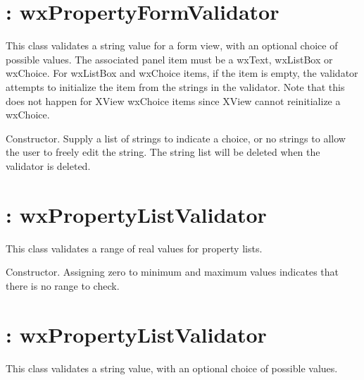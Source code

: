 \section{: wxPropertyFormValidator}\label{wxstringformvalidator}


This class validates a string value for a form view, with an optional choice of possible values.
The associated panel item must be a wxText, wxListBox or wxChoice. For wxListBox and wxChoice items,
if the item is empty, the validator attempts to initialize the item from the strings in
the validator. Note that this does not happen for XView wxChoice items since XView cannot reinitialize a wxChoice.
 


Constructor. Supply a list of strings to indicate a choice, or no strings to allow the
user to freely edit the string. The string list will be deleted when the validator is deleted.


\section{: wxPropertyListValidator}\label{wxreallistvalidator}


This class validates a range of real values for property lists.



Constructor. Assigning zero to minimum and maximum values indicates that there is no range to check.


\section{: wxPropertyListValidator}\label{wxstringlistvalidator}


This class validates a string value, with an optional choice of possible values.


